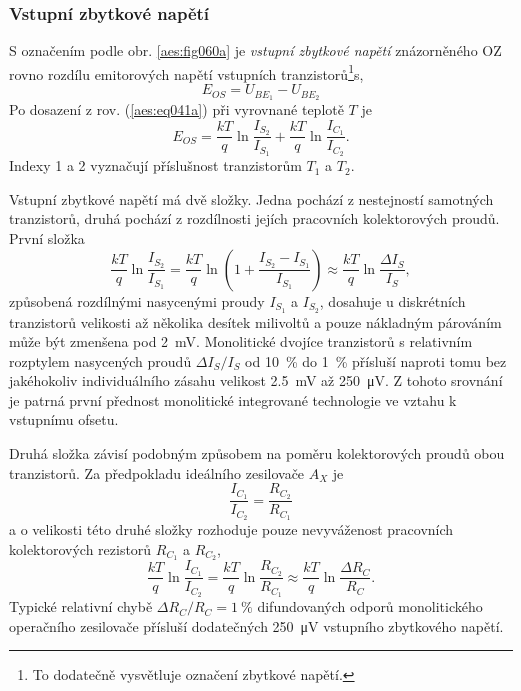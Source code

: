       \subsubsection{Vstupní zbytkové napětí}\label{aesIchIIIsecIIIssecVI}
        S označením podle obr. \ref{aes:fig060a} je \emph{vstupní zbytkové napětí} znázorněného OZ
        rovno rozdílu emitorových napětí vstupních tranzistorů\footnote{To dodatečně vysvětluje
        označení zbytkové napětí.}s,
        \begin{equation*}
          E_{OS} = U_{BE_1} - U_{BE_2}
        \end{equation*}
        Po dosazení z rov. (\ref{aes:eq041a}) při vyrovnané teplotě \(T\) je
        \begin{equation}\label{aes:eq046}
          E_{OS}  = \dfrac{kT}{q}\ln\dfrac{I_{S_2}}{I_{S_1}} + 
                    \dfrac{kT}{q}\ln\dfrac{I_{C_1}}{I_{C_2}}. 
        \end{equation}
        Indexy 1 a 2 vyznačují příslušnost tranzistorům \(T_1\) a \(T_2\).

        Vstupní zbytkové napětí má dvě složky. Jedna pochází z nestejností samotných tranzistorů,
        druhá pochází z rozdílnosti jejích pracovních kolektorových proudů. První složka
        \begin{equation}\label{aes:eq047}
          \dfrac{kT}{q}\ln\dfrac{I_{S_2}}{I_{S_1}} = 
          \dfrac{kT}{q}\ln\left(1+\dfrac{I_{S_2} - I_{S_1}}{I_{S_1}}\right) \approx 
          \dfrac{kT}{q}\ln\dfrac{\Delta I_{S}}{I_{S}}, 
        \end{equation}
        způsobená rozdílnými nasycenými proudy \(I_{S_1}\) a \(I_{S_2}\), dosahuje u diskrétních
        tranzistorů velikosti až několika desítek milivoltů a pouze nákladným párováním může být
        zmenšena pod \SI{2}{\mV}. Monolitické dvojíce tranzistorů s relativním rozptylem nasycených
        proudů \(\Delta I_S/I_S\) od \SI{10}{\percent} do \SI{1}{\percent} přísluší naproti tomu bez
        jakéhokoliv individuálního zásahu velikost \SI{2.5}{\mV} až \SI{250}{\uV}. Z tohoto srovnání
        je patrná první přednost monolitické integrované technologie ve vztahu k vstupnímu ofsetu.

        Druhá složka závisí podobným způsobem na poměru kolektorových proudů obou tranzistorů. Za
        předpokladu ideálního zesilovače \(A_X\) je
        \begin{equation}\label{aes:eq048}
          \dfrac{I_{C_1}}{I_{C_2}} = \dfrac{R_{C_2}}{R_{C_1}} 
        \end{equation}
        a o velikosti této druhé složky rozhoduje pouze nevyváženost pracovních kolektorových
        rezistorů \(R_{C_1}\) a \(R_{C_2}\),
        \begin{equation}\label{aes:eq049}
          \dfrac{kT}{q}\ln\dfrac{I_{C_1}}{I_{C_2}} = \dfrac{kT}{q}\ln\dfrac{R_{C_2}}{R_{C_1}}
          \approx\dfrac{kT}{q}\ln\dfrac{\Delta R_C}{R_C}.
        \end{equation}
        Typické relativní chybě \(\Delta R_C/R_C = \SI{1}{\percent}\) difundovaných odporů
        monolitického operačního zesilovače přísluší dodatečných \SI{250}{\uV} vstupního zbytkového
        napětí.

